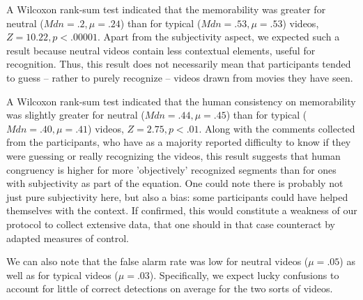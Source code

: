 \documentclass[sigconf]{acmart}
\begin{document}
A Wilcoxon rank-sum test indicated that the memorability was greater for neutral ($Mdn=.2, \mu=.24$) than for typical ($Mdn=.53, \mu=.53$) videos, $Z=10.22, p<.00001$.
Apart from the subjectivity aspect, we expected such a result because neutral videos contain less contextual elements, useful for recognition.
Thus, this result does not necessarily mean that participants tended to guess -- rather to purely recognize -- videos drawn from movies they have seen.

A Wilcoxon rank-sum test indicated that the human consistency on memorability was slightly greater for neutral ($Mdn=.44, \mu=.45$) than for typical ($Mdn=.40, \mu=.41$) videos, $Z=2.75, p<.01$.
Along with the comments collected from the participants, who have as a majority reported difficulty to know if they were guessing or really recognizing the videos, this result suggests that human congruency is higher for more 'objectively' recognized segments than for ones with subjectivity as part of the equation. 
One could note there is probably not just pure subjectivity here, but also a bias: some participants could have helped themselves with the context.
If confirmed, this would constitute a weakness of our protocol to collect extensive data, that one should in that case counteract by adapted measures of control.

We can also note that the false alarm rate was low for neutral videos ($\mu=.05$) as well as for typical videos ($\mu=.03$).
Specifically, we expect lucky confusions to account for little of correct detections on average for the two sorts of videos.

\end{document}
